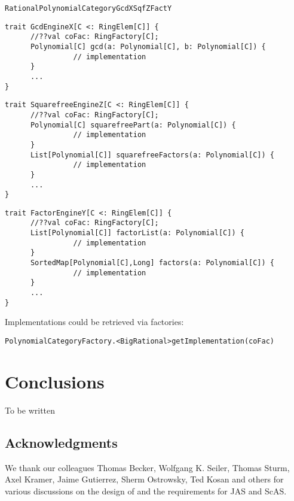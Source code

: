 \documentclass{llncs}
\begin{document}
\begin{verbatim}
RationalPolynomialCategoryGcdXSqfZFactY
\end{verbatim}

\begin{verbatim}
trait GcdEngineX[C <: RingElem[C]] {
      //??val coFac: RingFactory[C];
      Polynomial[C] gcd(a: Polynomial[C], b: Polynomial[C]) {
                // implementation 
      }
      ...
}
\end{verbatim}

\begin{verbatim}
trait SquarefreeEngineZ[C <: RingElem[C]] {
      //??val coFac: RingFactory[C];
      Polynomial[C] squarefreePart(a: Polynomial[C]) {
                // implementation 
      }
      List[Polynomial[C]] squarefreeFactors(a: Polynomial[C]) {
                // implementation 
      }
      ...
}
\end{verbatim}

\begin{verbatim}
trait FactorEngineY[C <: RingElem[C]] {
      //??val coFac: RingFactory[C];
      List[Polynomial[C]] factorList(a: Polynomial[C]) {
                // implementation 
      }
      SortedMap[Polynomial[C],Long] factors(a: Polynomial[C]) {
                // implementation 
      }
      ...
}
\end{verbatim}


Implementations could be retrieved via factories:
\begin{verbatim}
PolynomialCategoryFactory.<BigRational>getImplementation(coFac)
\end{verbatim}



\section{Conclusions} %

To be written


\subsection*{Acknowledgments} %

We thank our colleagues Thomas Becker, Wolfgang K. Seiler, Thomas
Sturm, Axel Kramer, Jaime Gutierrez, Sherm Ostrowsky, Ted Kosan and
others for various discussions on the design of and the requirements
for JAS and ScAS. 




\end{document}
